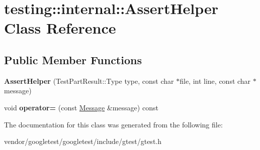 \hypertarget{classtesting_1_1internal_1_1AssertHelper}{}\section{testing\+:\+:internal\+:\+:Assert\+Helper Class Reference}
\label{classtesting_1_1internal_1_1AssertHelper}
\subsection*{Public Member Functions}
\begin{DoxyCompactItemize}
\item 
{\bfseries Assert\+Helper} (Test\+Part\+Result\+::\+Type type, const char $\ast$file, int line, const char $\ast$message)\hypertarget{classtesting_1_1internal_1_1AssertHelper_ac2c9334518fd4087189b4505567a3c90}{}\label{classtesting_1_1internal_1_1AssertHelper_ac2c9334518fd4087189b4505567a3c90}

\item 
void {\bfseries operator=} (const \hyperlink{classtesting_1_1Message}{Message} \&message) const \hypertarget{classtesting_1_1internal_1_1AssertHelper_ab721be11cb9aca8a361ca1f014ca5f80}{}\label{classtesting_1_1internal_1_1AssertHelper_ab721be11cb9aca8a361ca1f014ca5f80}

\end{DoxyCompactItemize}


The documentation for this class was generated from the following file\+:\begin{DoxyCompactItemize}
\item 
vendor/googletest/googletest/include/gtest/gtest.\+h\end{DoxyCompactItemize}
